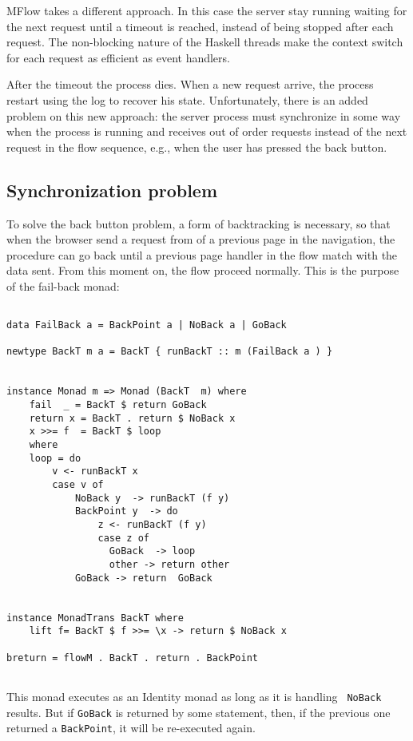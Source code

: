 \documentclass{tmr}
\begin{document}
MFlow takes a different approach. In this case the server  stay running waiting for the next request until a timeout is reached,  instead of being stopped after each request. The non-blocking nature of the Haskell threads make the context switch for each request as efficient as event handlers. 

After the timeout the process dies. When a new request arrive, the process restart using the log to recover his state. Unfortunately, there is an added problem on this new approach: the server process must synchronize in some way when the process is running and receives out of order requests  instead of the next request in the flow sequence, e.g., when the user has pressed the back button. 
 
\subsection{Synchronization problem} 
To solve the back button problem, a form of backtracking is necessary, so that when the browser send a request from of a previous page in the navigation, the procedure can go back until a previous page handler in the flow match with the data sent. From this moment on, the flow proceed normally. This is the purpose of the fail-back monad: 
 
{\tt 
 
\begin{verbatim} 
 
data FailBack a = BackPoint a | NoBack a | GoBack 
 
newtype BackT m a = BackT { runBackT :: m (FailBack a ) } 
 
 
instance Monad m => Monad (BackT  m) where 
    fail  _ = BackT $ return GoBack 
    return x = BackT . return $ NoBack x 
    x >>= f  = BackT $ loop 
    where 
    loop = do 
        v <- runBackT x 
        case v of 
            NoBack y  -> runBackT (f y) 
            BackPoint y  -> do 
                z <- runBackT (f y) 
                case z of 
                  GoBack  -> loop 
                  other -> return other 
            GoBack -> return  GoBack 
 
 
instance MonadTrans BackT where 
    lift f= BackT $ f >>= \x -> return $ NoBack x 
 
breturn = flowM . BackT . return . BackPoint 
 
\end{verbatim} 
 
} 
 
This monad executes as an Identity monad as long as it is handling {\tt 
NoBack} results. But if {\tt GoBack} is returned by some statement, then, if the previous one returned a {\tt BackPoint}, it will be re-executed again. 
\end{document}
